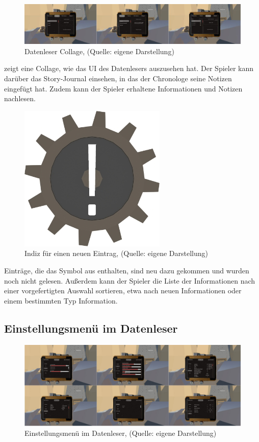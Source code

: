 \begin{figure}[ht]
\centering
\includegraphics[width=1\linewidth]{content/pictures/Datenleser_c.jpg}
\caption{Datenleser Collage, (Quelle: eigene Darstellung)}
\label{fig:datenleser_collage}
\end{figure}

 zeigt eine Collage, wie das \ac{UI} des Datenlesers auszusehen hat. Der Spieler kann darüber das Story-Journal einsehen, in das der Chronologe seine Notizen eingefügt hat. Zudem kann der Spieler erhaltene Informationen und Notizen nachlesen. 

\begin{figure}[ht]
\centering
\includegraphics[width=0.2\linewidth]{content/pictures/NeuIndiz.jpg}
\caption{Indiz für einen neuen Eintrag, (Quelle: eigene Darstellung)}
\label{fig:indiz_neu}
\end{figure}

Einträge, die das Symbol aus  enthalten, sind neu dazu gekommen und wurden noch nicht gelesen. Außerdem kann der Spieler die Liste der Informationen nach einer vorgefertigten Auswahl sortieren, etwa nach neuen Informationen oder einem bestimmten Typ Information.

\subsection{Einstellungsmenü im Datenleser}

\begin{figure}[ht]
\centering
\includegraphics[width=1\linewidth]{content/pictures/PasemneÃ¼ UI.jpg}
\caption{Einstellungsmenü im Datenleser, (Quelle: eigene Darstellung)}
\label{fig:pausemenue_settings}
\end{figure}

